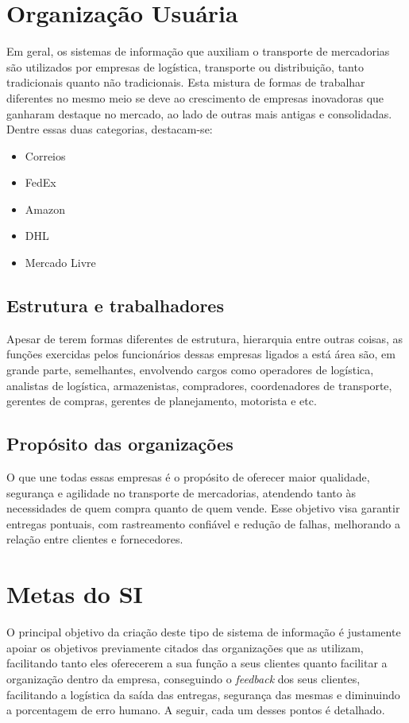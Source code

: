 \documentclass[conference]{IEEEtran}
\begin{document}
\section{Organização Usuária}
Em geral, os sistemas de informação que auxiliam o transporte de mercadorias são utilizados por empresas de logística, transporte ou distribuição, tanto tradicionais quanto não tradicionais. Esta mistura de formas de trabalhar diferentes no mesmo meio se deve ao crescimento de empresas inovadoras que ganharam destaque no mercado, ao lado de outras mais antigas e consolidadas. Dentre essas duas categorias, destacam-se:
\begin{itemize}
    \item Correios
    \item FedEx
    \item Amazon
    \item DHL
    \item Mercado Livre
\end{itemize}

\subsection{Estrutura e trabalhadores}
Apesar de terem formas diferentes de estrutura, hierarquia entre outras coisas, as funções exercidas pelos funcionários dessas empresas ligados a está área são, em grande parte, semelhantes, envolvendo cargos como operadores de logística, analistas de logística, armazenistas, compradores, coordenadores de transporte, gerentes de compras, gerentes de planejamento, motorista e etc\cite{cargos}. 

\subsection{Propósito das organizações}
O que une todas essas empresas é o propósito de oferecer maior qualidade, segurança e agilidade no transporte de mercadorias, atendendo tanto às necessidades de quem compra quanto de quem vende. Esse objetivo visa garantir entregas pontuais, com rastreamento confiável e redução de falhas, melhorando a relação entre clientes e fornecedores.

\section{Metas do SI}
O principal objetivo da criação deste tipo de sistema de informação é justamente apoiar os objetivos previamente citados das organizações que as utilizam, facilitando tanto eles oferecerem a sua função a seus clientes quanto facilitar a organização dentro da empresa, conseguindo o \textit{feedback} dos seus clientes, facilitando a logística da saída das entregas, segurança das mesmas e diminuindo a porcentagem de erro humano. A seguir, cada um desses pontos é detalhado\cite{silogistica}.
\end{document}
